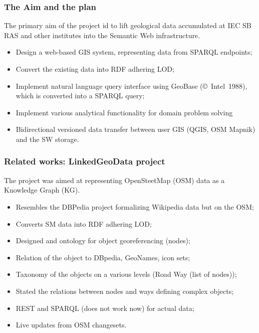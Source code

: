\documentclass[10pt]{beamer}
\begin{document}
\begin{frame}
  \frametitle{The Aim and the plan}
  The primary aim of the project id to lift geological data accumulated at IEC SB RAS and other institutes into the Semantic Web infrastructure.
  \begin{itemize}
  \item Design a web-based GIS system, representing data from SPARQL endpoints;
  \item Convert the existing data into RDF adhering LOD;
  \item Implement natural language query interface using GeoBase (\copyright~Intel~1988), which is converted into a SPARQL query;
  \item Implement various analytical functionality for domain problem solving
  \item Bidirectional versioned data transfer between user GIS (QGIS, OSM Mapnik) and the SW storage. %
  \end{itemize}
\end{frame}


\begin{frame}
  \frametitle{Related works: LinkedGeoData project}
  The project \cite{lgd} was aimed at representing OpenSteetMap (OSM) data as a Knowledge Graph (KG).
  \begin{itemize}
  \item Resembles the DBPedia project formalizing Wikipedia data but on the OSM;
  \item Converts SM data into RDF adhering LOD;
  \item Designed and ontology for object georeferencing (nodes);
  \item Relation of the object to DBpedia, GeoNames, icon sets;
  \item Taxonomy of the objects on a various levels (Road \to Way (list of nodes)); %
  \item Stated the relations between nodes and ways defining complex objects;
  \item REST and SPARQL (does not work now) for actual data;
  \item Live updates from OSM changesets.
  \end{itemize}

\end{frame}
\end{document}
